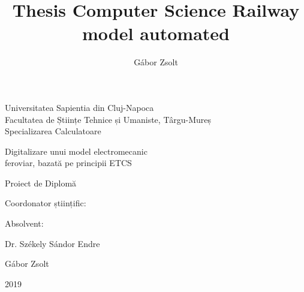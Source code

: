 \documentclass[a4paper,12pt]{article}
\author{Gábor Zsolt }
\title{Thesis Computer Science Railway model automated}
\begin{document}
\newpage
\pagestyle{empty}
    \begin{center}
        {\Large Universitatea Sapientia din Cluj-Napoca}\\\vspace{0.07in}
		{\Large Facultatea de Științe Tehnice și Umaniste, Târgu-Mureș}\\\vspace{0.07in}
		{\Large Specializarea Calculatoare}\\
		
		\vspace{2.35in}
		
		{\huge Digitalizare unui model electromecanic }\\\vspace{0.15in}
		{\huge feroviar, bazată pe principii ETCS}
		
		\vspace{0.5in}
		
		{\LARGE Proiect de Diplomă }
		
	\end{center}
	
	\vspace{2.0in}
	
	\begin{multicols}{2}
		\begin{flushleft}
			{\Large Coordonator științific:}
		\end{flushleft}
		\columnbreak
		\begin{flushright}
			{\Large Absolvent:}
		\end{flushright}
	\end{multicols}
	\begin{multicols}{2}
		\begin{flushleft}
			{\LARGE Dr. Székely Sándor Endre}
		\end{flushleft}
		\columnbreak
		\begin{flushright}
			{\LARGE Gábor Zsolt}
		\end{flushright}
	\end{multicols}
	
	\vspace{1.5in}
		
	\begin{center}
		{\LARGE 2019}
	\end{center}
	
\newpage
 
\newpage

\newpage

\end{document}
